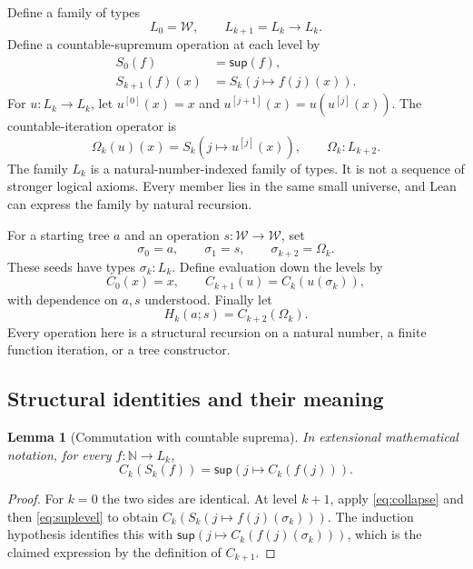 \documentclass[11pt]{article}
\newtheorem{lemma}[theorem]{Lemma}
\theoremstyle{definition}
\newcommand{\N}{\mathbb N}
\newcommand{\W}{\mathcal W}
\newcommand{\Sup}{\mathsf{sup}}
\begin{document}
Define a family of types
\begin{equation}\label{eq:levels}
 L_0=\W,\qquad L_{k+1}=L_k\to L_k.
\end{equation}
Define a countable-supremum operation at each level by
\begin{align}
 S_0(f)&=\Sup(f),\label{eq:suplevel}\\
 S_{k+1}(f)(x)&=S_k(j\mapsto f(j)(x)).
\end{align}
For $u:L_k\to L_k$, let $u^{[0]}(x)=x$ and
$u^{[j+1]}(x)=u(u^{[j]}(x))$. The countable-iteration operator is
\begin{equation}\label{eq:omega}
 \Omega_k(u)(x)=S_k(j\mapsto u^{[j]}(x)),
 \qquad \Omega_k:L_{k+2}.
\end{equation}
The family $L_k$ is a natural-number-indexed family of types. It is not a
sequence of stronger logical axioms. Every member lies in the same small
universe, and Lean can express the family by natural recursion.

For a starting tree $a$ and an operation $s:\W\to\W$, set
\begin{equation}\label{eq:seed}
 \sigma_0=a,\qquad\sigma_1=s,\qquad
 \sigma_{k+2}=\Omega_k.
\end{equation}
These seeds have types $\sigma_k:L_k$. Define evaluation down the levels by
\begin{equation}\label{eq:collapse}
 C_0(x)=x,\qquad C_{k+1}(u)=C_k(u(\sigma_k)),
\end{equation}
with dependence on $a,s$ understood. Finally let
\begin{equation}\label{eq:high}
 H_k(a;s)=C_{k+2}(\Omega_k).
\end{equation}
Every operation here is a structural recursion on a natural number, a finite
function iteration, or a tree constructor.

\subsection{Structural identities and their meaning}

\begin{lemma}[Commutation with countable suprema]\label{lem:commute}
In extensional mathematical notation, for every $f:\N\to L_k$,
\[
 C_k(S_k(f))=\Sup(j\mapsto C_k(f(j))).
\]
\end{lemma}
\begin{proof}
For $k=0$ the two sides are identical. At level $k+1$, apply
\eqref{eq:collapse} and then \eqref{eq:suplevel} to obtain
$C_k(S_k(j\mapsto f(j)(\sigma_k)))$. The induction hypothesis identifies
this with $\Sup(j\mapsto C_k(f(j)(\sigma_k)))$, which is the claimed
expression by the definition of $C_{k+1}$.
\end{proof}
\end{document}
